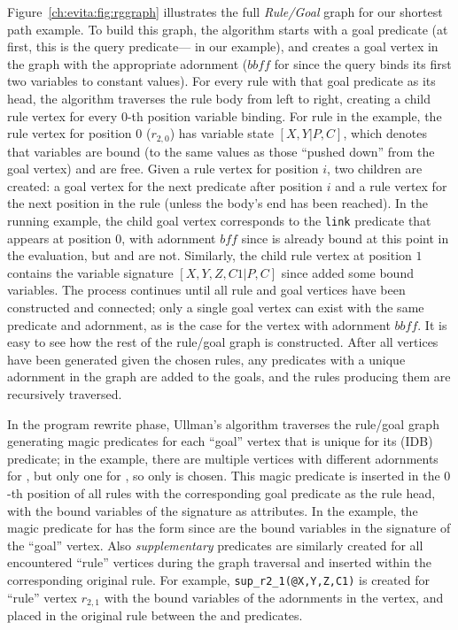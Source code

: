 {Figure~\ref{ch:evita:fig:rggraph} illustrates the full {\em Rule/Goal} graph
for our shortest path example.  To build this graph, the algorithm starts with
a goal predicate (at first, this is the query predicate--- in our
example), and creates a goal vertex in the graph with the appropriate adornment
($\mathit{bbff}$ for  since the query binds its first two variables to
constant values).  For every rule with that goal predicate as its head, the
algorithm traverses the rule body from left to right, creating a child rule
vertex for every $0$-th position variable binding.  For rule  in the
example, the rule vertex for position $0$ ($r_{2,0}$) has variable state
$[X,Y|P,C]$, which denotes that variables  are bound (to the same
values as those ``pushed down'' from the goal vertex) and  are free.
Given a rule vertex for position $i$, two children are created: a goal vertex
for the next predicate after position $i$ and a rule vertex for the next
position in the rule (unless the body's end has been reached).  In the running
example, the child goal vertex corresponds to the {\tt link} predicate that
appears at position $0$, with adornment $\mathit{bff}$ since  is already
bound at this point in the evaluation, but  and  are not.
Similarly, the child rule vertex at position $1$ contains the variable
signature $[X,Y,Z,C1|P,C]$ since  added some bound variables.  The
process continues until all rule and goal vertices have been constructed and
connected; only a single goal vertex can exist with the same predicate and
adornment, as is the case for the  vertex with adornment
$\mathit{bbff}$.  It is easy to see how the rest of the rule/goal graph is
constructed.  After all vertices have been generated given the chosen rules,
any predicates with a unique adornment in the graph are added to the goals, and
the rules producing them are recursively traversed.


In the program rewrite phase, Ullman's algorithm traverses the rule/goal
graph generating magic predicates for each ``goal'' vertex that is
unique for its (IDB) predicate; in the example, there are multiple vertices
with different adornments for , but only one for ,
so only  is chosen.  This magic predicate is inserted in
the $0$-th position of all rules with the corresponding goal predicate
as the rule head, with the bound variables of the signature as
attributes. In the example, the magic predicate for  has the
form  since  are the bound 
variables in the signature of the ``goal'' vertex.  Also
\emph{supplementary} predicates are similarly created for all
encountered ``rule'' vertices during the graph traversal and inserted
within the corresponding original rule.  For example, {\tt sup\_r2\_1(@X,Y,Z,C1)} 
is created for ``rule'' vertex $r_{2,1}$ with the bound variables of
the adornments in the vertex, and placed in the original rule 
between the  and  predicates.


}
